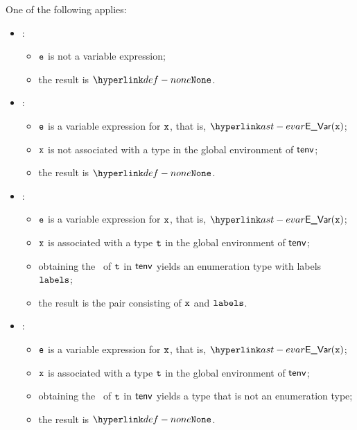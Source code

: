 \ProseParagraph
One of the following applies:
\begin{itemize}
  \item {}:
  \begin{itemize}
    \item $\ve$ is not a variable expression;
    \item the result is $\None$.
  \end{itemize}

  \item {}:
  \begin{itemize}
    \item $\ve$ is a variable expression for $\vx$, that is, $\EVar(\vx)$;
    \item $\vx$ is not associated with a type in the global environment of $\tenv$;
    \item the result is $\None$.
  \end{itemize}

  \item {}:
  \begin{itemize}
    \item $\ve$ is a variable expression for $\vx$, that is, $\EVar(\vx)$;
    \item $\vx$ is associated with a type $\vt$ in the global environment of $\tenv$;
    \item obtaining the \underlyingtype\ of $\vt$ in $\tenv$ yields an enumeration type with labels $\vlabels$\ProseOrTypeError;
    \item the result is the pair consisting of $\vx$ and $\vlabels$.
  \end{itemize}

  \item {}:
  \begin{itemize}
    \item $\ve$ is a variable expression for $\vx$, that is, $\EVar(\vx)$;
    \item $\vx$ is associated with a type $\vt$ in the global environment of $\tenv$;
    \item obtaining the \underlyingtype\ of $\vt$ in $\tenv$ yields a type that is not an enumeration type;
    \item the result is $\None$.
  \end{itemize}
\end{itemize}

\FormallyParagraph
\begin{mathpar}
\end{mathpar}

